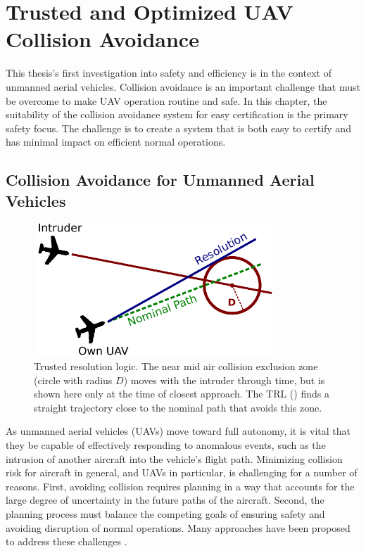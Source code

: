 \chapter{Trusted and Optimized UAV Collision Avoidance} \label{chap:uav}

This thesis's first investigation into safety and efficiency is in the context of unmanned aerial vehicles.
Collision avoidance is an important challenge that must be overcome to make UAV operation routine and safe.
In this chapter, the suitability of the collision avoidance system for easy certification is the primary safety focus.
The challenge is to create a system that is both easy to certify and has minimal impact on efficient normal operations.

\section{Collision Avoidance for Unmanned Aerial Vehicles} \label{sec:uavintro}

\begin{figure}
    \centering
    \includegraphics[height=5.0cm]{media/simple_trl.pdf}
    \caption[Trusted resolution logic]{Trusted resolution logic. The near mid air collision exclusion zone (circle with radius $D$) moves with the intruder through time, but is shown here only at the time of closest approach. The TRL () finds a straight trajectory close to the nominal path that avoids this zone.}
    \label{fig:trl}
\end{figure}

As unmanned aerial vehicles (UAVs) move toward full autonomy, it is vital that they be capable of effectively responding to anomalous events, such as the intrusion of another aircraft into the vehicle's flight path. Minimizing collision risk for aircraft in general, and UAVs in particular, is challenging for a number of reasons. First, avoiding collision requires planning in a way that accounts for the large degree of uncertainty in the future paths of the aircraft. Second, the planning process must balance the competing goals of ensuring safety and avoiding disruption of normal operations. Many approaches have been proposed to address these challenges \cite{JKK-LCY:00,HYO-MJK:15,RB-CF-HE:09,GH-RB-JM:11,HH-JJ-CM:10,AN-CM-GD:12,ST-MJK-LPK-TLP-JKK:10,MJK-JPC:11,MJK-JPC-LPK-TL:10,LPK-TL:09,HB-DH-MJK-WSL:12,JEH-MJK-WAO:13,EJR:14}.

